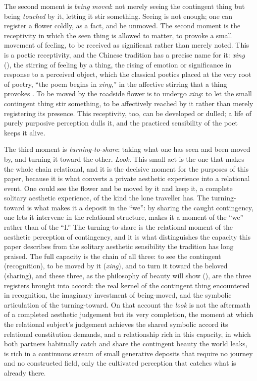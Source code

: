 The second moment is \emph{being moved}: not merely seeing the contingent thing but being \emph{touched} by it, letting it stir something. Seeing is not enough; one can register a flower coldly, as a fact, and be unmoved. The second moment is the receptivity in which the seen thing is allowed to matter, to provoke a small movement of feeling, to be received as significant rather than merely noted. This is a poetic receptivity, and the Chinese tradition has a precise name for it: \emph{xing} (), the stirring of feeling by a thing, the rising of emotion or significance in response to a perceived object, which the classical poetics placed at the very root of poetry, ``the poem begins in \emph{xing},'' in the affective stirring that a thing provokes \parencite{owen1992}. To be moved by the roadside flower is to undergo \emph{xing}: to let the small contingent thing stir something, to be affectively reached by it rather than merely registering its presence. This receptivity, too, can be developed or dulled; a life of purely purposive perception dulls it, and the practiced sensibility of the poet keeps it alive.

The third moment is \emph{turning-to-share}: taking what one has seen and been moved by, and turning it toward the other. \emph{Look.} This small act is the one that makes the whole chain relational, and it is the decisive moment for the purposes of this paper, because it is what converts a private aesthetic experience into a relational event. One could see the flower and be moved by it and keep it, a complete solitary aesthetic experience, of the kind the lone traveller has. The turning-toward is what makes it a deposit in the ``we'': by sharing the caught contingency, one lets it intervene in the relational structure, makes it a moment of the ``we'' rather than of the ``I.'' The turning-to-share is the relational moment of the aesthetic perception of contingency, and it is what distinguishes the capacity this paper describes from the solitary aesthetic sensibility the tradition has long praised. The full capacity is the chain of all three: to see the contingent (recognition), to be moved by it (\emph{xing}), and to turn it toward the beloved (sharing), and these three, as the philosophy of beauty will show (), are the three registers brought into accord: the real kernel of the contingent thing encountered in recognition, the imaginary investment of being-moved, and the symbolic articulation of the turning-toward. On that account the \emph{look} is not the aftermath of a completed aesthetic judgement but its very completion, the moment at which the relational subject's judgement achieves the shared symbolic accord its relational constitution demands, and a relationship rich in this capacity, in which both partners habitually catch and share the contingent beauty the world leaks, is rich in a continuous stream of small generative deposits that require no journey and no constructed field, only the cultivated perception that catches what is already there.

